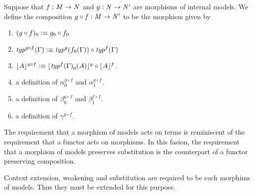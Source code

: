 \begin{defn}
Suppose that $f:\mfM\to\mfN$ and $g:\mfN\to\mfN'$ are morphisms of internal models.
We define the composition $g\circ f:\mfM\to\mfN'$ to be the morphism given by
\begin{enumerate}
\item $(g\circ f)_0\defeq g_0\circ f_0$
\item $\mftypfunc{g\circ f}(\Gamma)\defeq\mftypfunc{g}(f_0(\Gamma))\circ\mftypfunc{f}(\Gamma)$
\item $\terms[g\circ f]{A}\defeq\terms[g]{\mftyp{f}{\Gamma}_0(A)}\circ\terms[f]{A}$.
\item a definition of $\alpha^{g\circ f}_0$ and $\alpha^{g\circ f}_1$.
\item a definition of $\beta^{g\circ f}_0$ and $\beta^{f\circ f}_1$.
\item a definition of $\gamma^{g\circ f}$. 
\end{enumerate}
\end{defn}

\begin{rmk}
The requirement that a morphism of models acts on terms is reminiscent of the requirement
that a functor acts on morphisms. In this fasion, the requirement that a morphism of
models preserves substitution is the counterpart of a functor preserving composition.
\end{rmk}
Context extension, weakening and substitution are required to be such morphims
of models. Thus they must be extended for this purpose.

